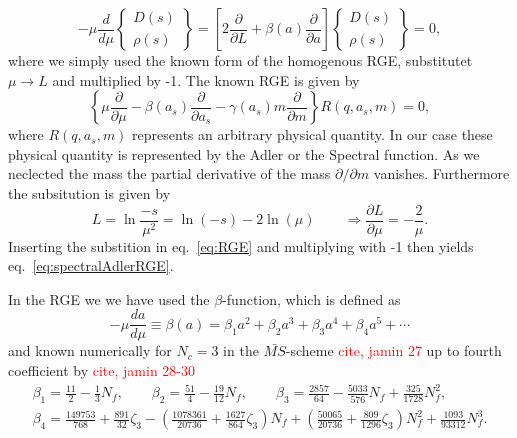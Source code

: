 \documentclass[11pt,a4paper]{article}
\begin{document}
\begin{equation}
\label{eq:spectralAdlerRGE}
	-\mu \frac{d}{d\mu} \left\{\begin{matrix}D(s) \\ \rho(s) \end{matrix}\right\} = \left[2\frac{\partial}{\partial L} + \beta(a) \frac{\partial}{\partial a} \right] \left\{\begin{matrix}D(s) \\ \rho(s) \end{matrix}\right\} = 0,
\end{equation}
where we simply used the known form of the homogenous RGE, substitutet $\mu \to L$ and multiplied by -1. The known RGE is given by
\begin{equation}
\label{eq:RGE}
	\left\{\mu \frac{\partial}{\partial \mu} - \beta(a_s) \frac{\partial}{\partial a_s} - \gamma(a_s) m\frac{\partial}{\partial m}\right\} R(q, a_s, m) = 0,
\end{equation}
where $R(q, a_s, m)$ represents an arbitrary physical quantity. In our case these physical quantity is represented by the Adler or the Spectral function. As we neclected the mass the partial derivative of the mass $\partial / \partial m$ vanishes. Furthermore the subsitution is given by
\begin{equation}
	L = \ln \frac{-s}{\mu^2} = \ln(-s) - 2 \ln(\mu) \qquad \Rightarrow \frac{\partial L}{\partial \mu} = - \frac{2}{\mu}.
\end{equation}
Inserting the substition in eq.~\ref{eq:RGE} and multiplying with -1 then yields eq.~\ref{eq:spectralAdlerRGE}. 

In the RGE we we have used the $\beta$-function, which is defined as
\begin{equation}
	- \mu \frac{d a}{d\mu} \equiv \beta(a) = \beta_1 a^2 + \beta_2 a^3 + \beta_3 a^4 + \beta_4 a^5 + \cdots 
\end{equation}
and known numerically for $N_c=3$ in the $\bar{MS}$-scheme \textcolor{red}{cite, jamin 27} up to fourth coefficient by \textcolor{red}{cite, jamin 28-30}
\begin{equation}
\begin{split}
	\beta_1 = \frac{11}{2} - \frac{1}{3} N_f, \qquad \beta_2 = \frac{51}{4}-\frac{19}{12}N_f, \qquad \beta_3 = \frac{2857}{64} - \frac{5033}{576}N_f + \frac{325}{1728} N_f^2, \\
	\beta_4 = \frac{149753}{768} + \frac{891}{32} \zeta_3 - \left(\frac{1078361}{20736} + \frac{1627}{864}\zeta_3\right) N_f + \left(\frac{50065}{20736} + \frac{809}{1296}\zeta_3\right) N_f^2 + \frac{1093}{93312}N_f^3.
\end{split}
\end{equation}
\end{document}
